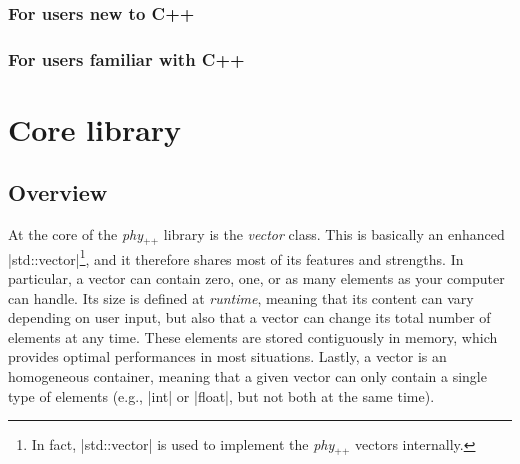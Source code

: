 \documentclass[12pt,a4paper]{report}
\newcommand{\phypp}{\textit{phy}$_{\text{++}}$\xspace}
\newcommand{\stdvec}{\cppinline|std::vector|\xspace}
\begin{document}
\subsection{For users new to C++ \label{SEC:instro:qstart:new}}
\subsection{For users familiar with C++ \label{SEC:instro:qstart:fami}}


\chapter{Core library \label{SEC:core}}

\section{Overview \label{SEC:core:overview}}
At the core of the \phypp library is the \emph{vector} class. This is basically an enhanced \stdvec\footnote{In fact, \stdvec is used to implement the \phypp vectors internally.}, and it therefore shares most of its features and strengths. In particular, a vector can contain zero, one, or as many elements as your computer can handle. Its size is defined at \emph{runtime}, meaning that its content can vary depending on user input, but also that a vector can change its total number of elements at any time. These elements are stored contiguously in memory, which provides optimal performances in most situations. Lastly, a vector is an homogeneous container, meaning that a given vector can only contain a single type of elements (e.g., \cppinline|int| or \cppinline|float|, but not both at the same time).
\end{document}
